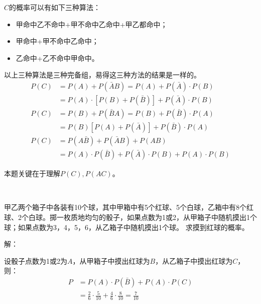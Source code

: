 $C$的概率可以有如下三种算法：
\begin{itemize}
    \item 甲命中乙不命中+甲不命中乙命中+甲乙都命中；
    \item 甲命中+甲不命中乙命中；
    \item 乙命中+乙不命中甲命中。
\end{itemize}
以上三种算法是三种完备组，易得这三种方法的结果是一样的。
\begin{align*}
P\left( C \right) &=P\left( A \right) +P\left( \bar{A}B \right) =P\left( A \right) +P\left( \bar{A} \right) \cdot P\left( B \right) \\
&=P\left( A \right) \cdot \left[ P\left( B \right) +P\left( \bar{B} \right) \right] +P\left( \bar{A} \right) \cdot P\left( B \right) \\
P\left( C \right) &=P\left( B \right) +P\left( \bar{B}A \right) =P\left( B \right) +P\left( \bar{B} \right) \cdot P\left( A \right) \\
&=P\left( B \right) \left[ P\left( A \right) +P\left( \bar{A} \right) \right] +P\left( \bar{B} \right) \cdot P\left( A \right) \\
P\left( C \right) &=P\left( A\bar{B} \right) +P\left( \bar{A}B \right) +P\left( AB \right) \\
&=P\left( A \right) \cdot P\left( \bar{B} \right) +P\left( \bar{A} \right) \cdot P\left( B \right) +P\left( A \right) \cdot P\left( B \right)
\end{align*}

\begin{tcolorbox}
本题关键在于理解$P\left( C \right) ,P\left( AC \right) $。
\end{tcolorbox}

~

\begin{example}
甲乙两个箱子中各装有10个球，其中甲箱中有5个红球、5个白球，乙箱中有8个红球、2个白球。掷一枚质地均匀的骰子，如果点数为1或2，从甲箱子中随机摸出1个球；如果点数为3，4，5，6，从乙箱子中随机摸出1个球。
求摸到红球的概率。
\end{example}

解：

设骰子点数为1或2为$A$，从甲箱子中摸出红球为$B$，从乙箱子中摸出红球为$C$，则：
\begin{align*}
P&=P\left( A \right) \cdot P\left( \bar{B} \right) +P\left( A \right) \cdot P\left( C \right) \\
&=\frac{2}{6}\cdot \frac{5}{10}+\frac{4}{6}\cdot \frac{8}{10}=\frac{7}{10}
\end{align*}

